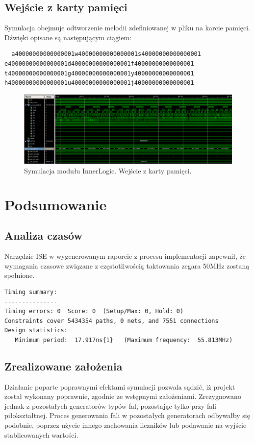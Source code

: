 \documentclass[12pt]{article}
\begin{document}
\subsection{Wejście z karty pamięci}
 Symulacja obejmuje odtworzenie melodii zdefiniowanej w pliku na karcie pamięci. Dźwięki opisane są następującym ciągiem:
 \begin{lstlisting}
  a40000000000000001w40000000000000001s40000000000000001 e40000000000000001d40000000000000001f40000000000000001 t40000000000000001g40000000000000001y40000000000000001 h40000000000000001u40000000000000001j40000000000000001
 \end{lstlisting}
\begin{figure}[H]
  \centering
  \includegraphics[decodearray={1 0 1 0 1 0}, width=\linewidth]{images/inner_sim_sd}
  \caption{Symulacja modułu InnerLogic. Wejście z karty pamięci.}
  \label{sim:sd}
\end{figure}

\section{Podsumowanie}
\subsection{Analiza czasów}
Narzędzie ISE w wygenerowanym raporcie z procesu implementacji zapewnił, że wymagania czasowe związane z częstotliwością taktowania zegara 50MHz zostaną spełnione.
\begin{lstlisting}
Timing summary: 
--------------- 
Timing errors: 0  Score: 0  (Setup/Max: 0, Hold: 0) 
Constraints cover 5434354 paths, 0 nets, and 7551 connections 
Design statistics: 
   Minimum period:  17.917ns{1}   (Maximum frequency:  55.813MHz) 
\end{lstlisting}

\subsection{Zrealizowane założenia}
Działanie poparte poprawnymi efektami symulacji pozwala sądzić, iż projekt został wykonany poprawnie, zgodnie ze wstępnymi założeniami. Zrezygnowano jednak z pozostałych generatorów typów fal, pozostając tylko przy fali piłokształtnej. Proces generowania fali w pozostałych generatorach odbywałby się podobnie, poprzez użycie innego zachowania liczników lub podawanie na wyjście stablicowanych wartości.
\end{document}
